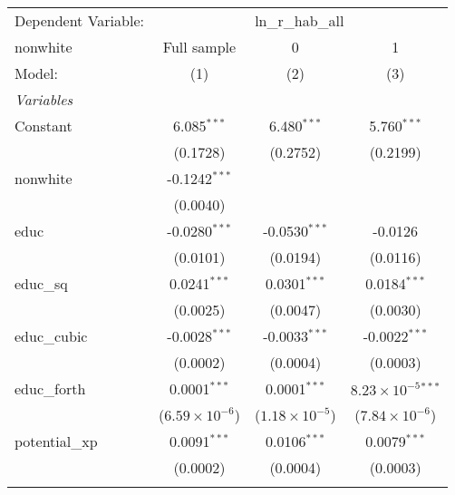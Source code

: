 
\begingroup
\centering
\begin{tabular}{lccc}
   \tabularnewline \midrule \midrule
   Dependent Variable: & \multicolumn{3}{c}{ln\_r\_hab\_all}\\
   nonwhite                        & Full sample             & 0                       & 1 \\   
   Model:                          & (1)                     & (2)                     & (3)\\  
   \midrule
   \emph{Variables}\\
   Constant                        & 6.085$^{***}$           & 6.480$^{***}$           & 5.760$^{***}$\\   
                                   & (0.1728)                & (0.2752)                & (0.2199)\\   
   nonwhite                        & -0.1242$^{***}$         &                         &   \\   
                                   & (0.0040)                &                         &   \\   
   educ                            & -0.0280$^{***}$         & -0.0530$^{***}$         & -0.0126\\   
                                   & (0.0101)                & (0.0194)                & (0.0116)\\   
   educ\_sq                        & 0.0241$^{***}$          & 0.0301$^{***}$          & 0.0184$^{***}$\\   
                                   & (0.0025)                & (0.0047)                & (0.0030)\\   
   educ\_cubic                     & -0.0028$^{***}$         & -0.0033$^{***}$         & -0.0022$^{***}$\\   
                                   & (0.0002)                & (0.0004)                & (0.0003)\\   
   educ\_forth                     & 0.0001$^{***}$          & 0.0001$^{***}$          & $8.23\times 10^{-5}$$^{***}$\\    
                                   & ($6.59\times 10^{-6}$)  & ($1.18\times 10^{-5}$)  & ($7.84\times 10^{-6}$)\\    
   potential\_xp                   & 0.0091$^{***}$          & 0.0106$^{***}$          & 0.0079$^{***}$\\   
                                   & (0.0002)                & (0.0004)                & (0.0003)\\   
$$
\end{tabular}
